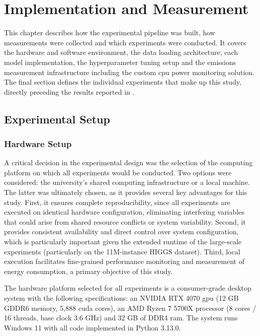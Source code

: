 \chapter{Implementation and Measurement}
\label{implementation}


This chapter describes how the experimental pipeline was built, how measurements were collected and which experiments were conducted. It covers the hardware and software environment, the data loading architecture, each model implementation, the hyperparameter tuning setup and the emissions measurement infrastructure including the custom \gls{cpu} power monitoring solution. The final section defines the individual experiments that make up this study, directly preceding the results reported in .

\section{Experimental Setup}

\subsection{Hardware Setup}
\label{sec:implementation_hardware}

A critical decision in the experimental design was the selection of the computing platform on which all experiments would be conducted. Two options were considered: the university's shared computing infrastructure or a local machine. The latter was ultimately chosen, as it provides several key advantages for this study. First, it ensures complete reproducibility, since all experiments are executed on identical hardware configuration, eliminating interfering variables that could arise from shared resource conflicts or system variability. Second, it provides consistent availability and direct control over system configuration, which is particularly important given the extended runtime of the large-scale experiments (particularly on the 11M-instance HIGGS dataset). Third, local execution facilitates fine-grained performance monitoring and measurement of energy consumption, a primary objective of this study.

The hardware platform selected for all experiments is a consumer-grade desktop system with the following specifications: an NVIDIA RTX 4070 \gls{gpu} (12 GB GDDR6 memory, 5,888 \gls{cuda} cores), an AMD Ryzen 7 5700X processor (8 cores / 16 threads, base clock 3.6 GHz) and 32 GB of DDR4 \gls{ram}. The system runs Windows 11 with all code implemented in Python 3.13.0.

